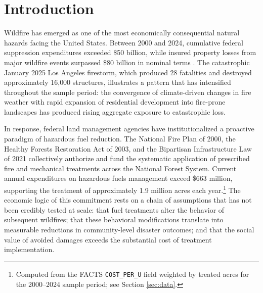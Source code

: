 \documentclass[12pt, letterpaper]{article}
\begin{document}
\begin{abstract}
\bigskip
\noindent \textit{JEL classification:} Q23, Q54, Q58, H54, C23, R52

\noindent \textit{Keywords:} wildfire, fuel reduction treatments, FACTS database, wildland-urban interface, disaster mitigation, two-way fixed effects, event study, welfare analysis
\end{abstract}

\newpage
\setcounter{page}{1}

\section{Introduction}\label{sec:intro}

Wildfire has emerged as one of the most economically consequential natural hazards facing the United States. Between 2000 and 2024, cumulative federal suppression expenditures exceeded \$50 billion, while insured property losses from major wildfire events surpassed \$80 billion in nominal terms \citep{calkin2005, baylis2023}. The catastrophic January 2025 Los Angeles firestorm, which produced 28 fatalities and destroyed approximately 16{,}000 structures, illustrates a pattern that has intensified throughout the sample period: the convergence of climate-driven changes in fire weather \citep{westerling2006, abatzoglou2016, brown2023} with rapid expansion of residential development into fire-prone landscapes \citep{radeloff2018, chen2024} has produced rising aggregate exposure to catastrophic loss.

In response, federal land management agencies have institutionalized a proactive paradigm of hazardous fuel reduction. The National Fire Plan of 2000, the Healthy Forests Restoration Act of 2003, and the Bipartisan Infrastructure Law of 2021 collectively authorize and fund the systematic application of prescribed fire and mechanical treatments across the National Forest System. Current annual expenditures on hazardous fuels management exceed \$663 million, supporting the treatment of approximately 1.9 million acres each year.\footnote{Computed from the FACTS \texttt{COST\_PER\_U} field weighted by treated acres for the 2000--2024 sample period; see Section \ref{sec:data}.} The economic logic of this commitment rests on a chain of assumptions that has not been credibly tested at scale: that fuel treatments alter the behavior of subsequent wildfires; that these behavioral modifications translate into measurable reductions in community-level disaster outcomes; and that the social value of avoided damages exceeds the substantial cost of treatment implementation.
\end{document}
